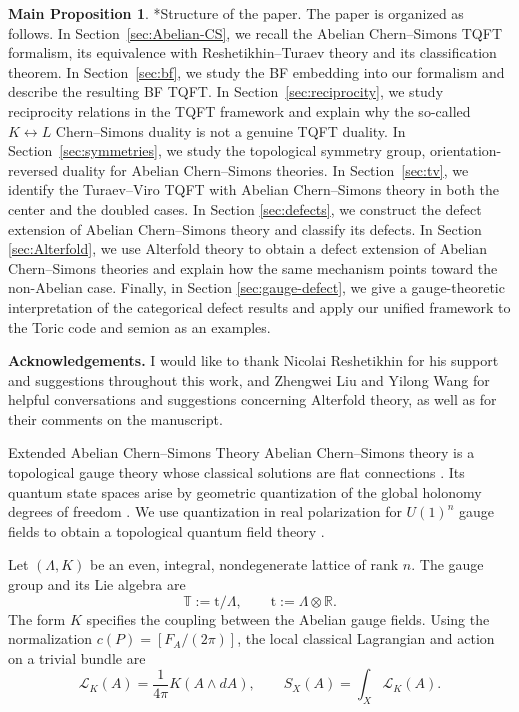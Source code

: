 \documentclass[12pt]{amsart}
\makeatletter
\renewcommand\section{\@startsection{section}{1}%
  \z@{.7\linespacing\@plus\linespacing}{.5\linespacing}%
  {\normalfont\bfseries\centering}}
\renewcommand\subsection{\@startsection{subsection}{2}%
  \z@{.5\linespacing\@plus.7\linespacing}{-.5em}%
  {\normalfont\bfseries}}
\numberwithin{equation}{section}
\theoremstyle{definition}
\newtheorem*{propositionA}{Main Proposition}
\makeatother
\begin{document}
\begin{propositionA}
\subsection*{Structure of the paper.} The paper is organized as follows. In Section~\ref{sec:Abelian-CS}, we recall the Abelian Chern--Simons TQFT formalism, its equivalence with Reshetikhin--Turaev theory and its classification theorem. In Section~\ref{sec:bf}, we study the BF embedding into our formalism and describe the resulting BF TQFT. In Section~\ref{sec:reciprocity}, we study reciprocity relations in the TQFT framework and explain why the so-called $K\leftrightarrow L$ Chern--Simons duality is not a genuine TQFT duality. In Section~\ref{sec:symmetries}, we study the topological symmetry group, orientation-reversed duality for Abelian Chern--Simons theories. In Section~\ref{sec:tv}, we identify the Turaev–Viro TQFT with Abelian Chern--Simons theory in both the center and the doubled cases. In Section \ref{sec:defects}, we construct the defect extension of Abelian Chern--Simons theory and classify its defects. In Section \ref{sec:Alterfold}, we use Alterfold theory to obtain a defect extension of Abelian Chern--Simons theories and explain how the same mechanism points toward the non-Abelian case. Finally, in Section \ref{sec:gauge-defect}, we give a gauge-theoretic interpretation of the categorical defect results and apply our unified framework to the Toric code and semion as an examples.
\end{propositionA}

\textbf{Acknowledgements.} I would like to thank Nicolai Reshetikhin for his support and suggestions throughout this work, and Zhengwei Liu and Yilong Wang for helpful conversations and suggestions concerning Alterfold theory, as well as for their comments on the manuscript.

\section{Extended Abelian Chern--Simons Theory}
\label{sec:Abelian-CS}
Abelian Chern--Simons theory is a topological gauge theory whose classical solutions are flat connections \cite{Witten:1988,FreedCS,FreedCS2}. Its quantum state spaces arise by geometric quantization of the global holonomy degrees of freedom \cite{Manoliu2}. We use quantization in real polarization for $U(1)^n$ gauge fields to obtain a topological quantum field theory \cite{Galviz2}.

Let $(\Lambda,K)$ be an even, integral, nondegenerate lattice of rank $n$. The gauge group and its Lie algebra are
$$
\mathbb T:=\mathrm t/\Lambda,
\qquad
\mathrm t:=\Lambda\otimes\mathbb R.
$$
The form $K$ specifies the coupling between the Abelian gauge fields. Using the normalization $c(P)=[F_A/(2\pi)]$, the local classical Lagrangian and action on a trivial bundle are
$$
\mathscr L_K(A)=\frac{1}{4\pi}K(A\wedge dA),
\qquad
S_X(A)=\int_X\mathscr L_K(A).
$$
\end{document}
